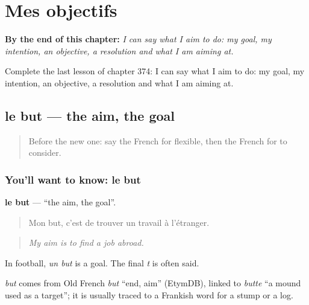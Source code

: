 
\chapter{Mes objectifs}
\label{ch:fr-mes-objectifs}

\begin{chapteropening}
\textbf{By the end of this chapter:} \emph{I can say what I aim to do: my goal, my intention, an objective, a resolution and what I am aiming at.}

Complete the last lesson of chapter 374: I can say what I aim to do: my goal, my intention, an objective, a resolution and what I am aiming at.
\end{chapteropening}

\section[le but]{le but — the aim, the goal}

\label{lesson:FR-C374-but}



\begin{quote}
Before the new one: say the French for flexible, then the French for to consider.
\end{quote}

\subsection*{You'll want to know: le but}
\textbf{le but} — \textquotedblleft{}the aim, the goal\textquotedblright{}.

\begin{quote}
Mon but, c'est de trouver un travail à l'étranger.
\end{quote}

\begin{quote}
\emph{My aim is to find a job abroad.}
\end{quote}

In football, \emph{un but} is a goal. The final \emph{t} is often said.

\begin{cousinweb}
\emph{but} comes from Old French \emph{but} \textquotedblleft{}end, aim\textquotedblright{} (EtymDB), linked to \emph{butte} \textquotedblleft{}a mound used as a target\textquotedblright{}; it is usually traced to a Frankish word for a stump or a log.
\end{cousinweb}

